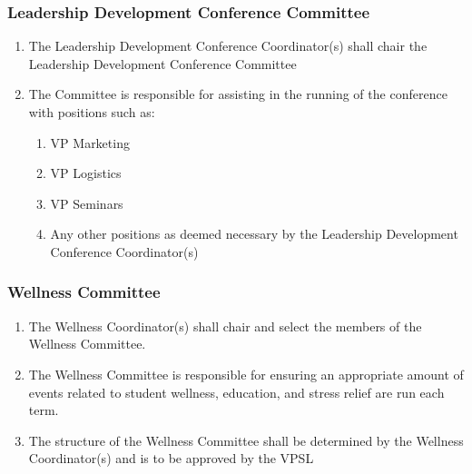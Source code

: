 \hypertarget{leadership-development-conference-committee}{%
 \subsubsection{Leadership Development Conference
  Committee}
 \label{leadership-development-conference-committee}}
\begin{enumerate}
 \item
  The Leadership Development Conference Coordinator(s) shall chair the
  Leadership Development Conference Committee
 \item
  The Committee is responsible for assisting in the running of the
  conference with positions such as:

  \begin{enumerate}
   \item
    VP Marketing
   \item
    VP Logistics
   \item
    VP Seminars
   \item
    Any other positions as deemed necessary by the Leadership
    Development Conference Coordinator(s)

  \end{enumerate}
\end{enumerate}

\hypertarget{wellness-committee}{%
 \subsubsection{Wellness Committee}
 \label{wellness-committee}}
\begin{enumerate}
 \item
  The Wellness Coordinator(s) shall chair and select the members of the
  Wellness Committee.
 \item
  The Wellness Committee is responsible for ensuring an appropriate
  amount of events related to student wellness, education, and stress
  relief are run each term.
 \item
  The structure of the Wellness Committee shall be determined by the
  Wellness Coordinator(s) and is to be approved by the VPSL

\end{enumerate}

